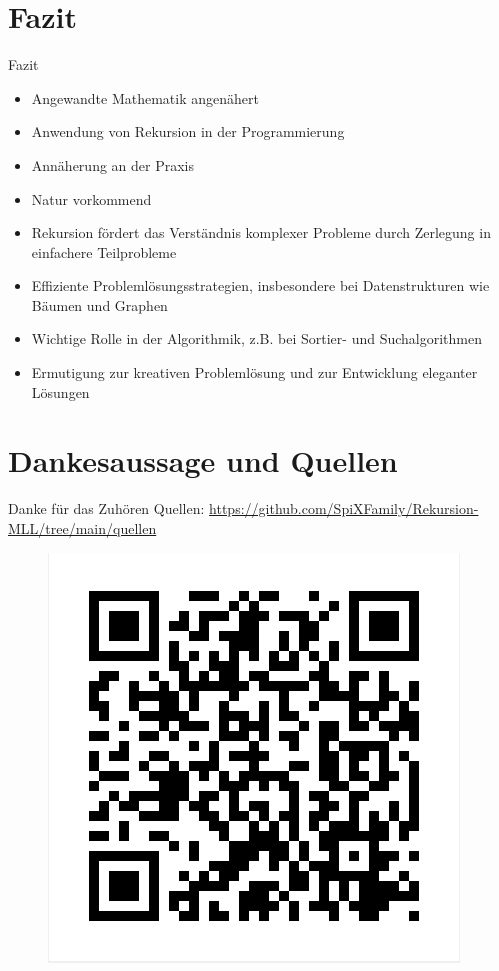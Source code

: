 \documentclass{beamer}
\begin{document}
\section{Fazit}
\begin{frame}{Fazit}
\begin{itemize}
\item Angewandte Mathematik angenähert
\item Anwendung von Rekursion in der Programmierung %
\item Annäherung an der Praxis
\item Natur vorkommend
\item Rekursion fördert das Verständnis komplexer Probleme durch Zerlegung in einfachere Teilprobleme
\item Effiziente Problemlösungsstrategien, insbesondere bei Datenstrukturen wie Bäumen und Graphen
\item Wichtige Rolle in der Algorithmik, z.B. bei Sortier- und Suchalgorithmen
\item Ermutigung zur kreativen Problemlösung und zur Entwicklung eleganter Lösungen
\end{itemize}
\end{frame}

\section*{Dankesaussage und Quellen}
\begin{frame}{Danke für das Zuhören}
Quellen: \url{https://github.com/SpiXFamily/Rekursion-MLL/tree/main/quellen}
\centering
\begin{figure}[H]
    \newline
    \includegraphics[width=0.5 \textwidth]{bilder/github-qr.png}
\end{figure}
\end{frame}
\end{document}

